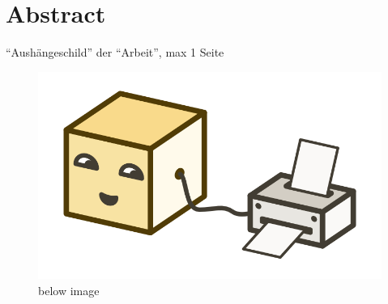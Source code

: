 \chapter*{Abstract}

\enquote{Aushängeschild} der ``Arbeit'', max 1 Seite


\begin{figure}[ht]
  \centering
  \includegraphics[width=0.4\linewidth]{assets/illustration-microservice-printer.png}
  \caption[for list of figures]{below image}
\end{figure}
